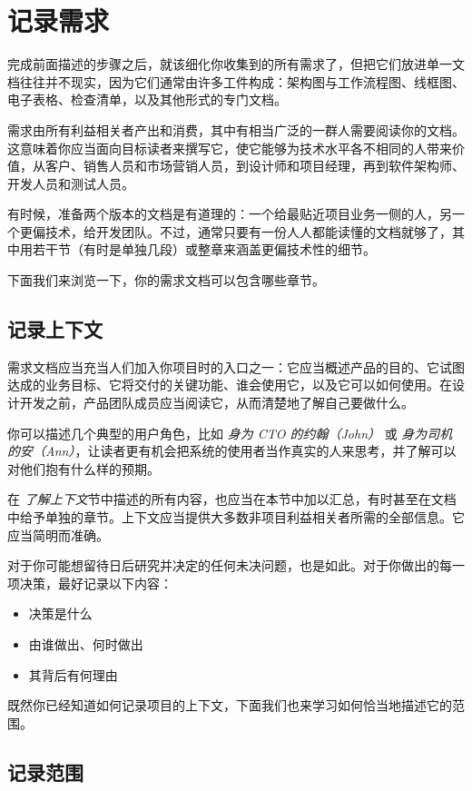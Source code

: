 \section{记录需求}

\label{idx:170}
完成前面描述的步骤之后，就该细化你收集到的所有需求了，但把它们放进单一文档往往并不现实，因为它们通常由许多工件构成：架构图与工作流程图、线框图、电子表格、检查清单，以及其他形式的专门文档。

需求由所有利益相关者产出和消费，其中有相当广泛的一群人需要阅读你的文档。这意味着你应当面向目标读者来撰写它，使它能够为技术水平各不相同的人带来价值，从客户、销售人员和市场营销人员，到设计师和项目经理，再到软件架构师、开发人员和测试人员。

有时候，准备两个版本的文档是有道理的：一个给最贴近项目业务一侧的人，另一个更偏技术，给开发团队。不过，通常只要有一份人人都能读懂的文档就够了，其中用若干节（有时是单独几段）或整章来涵盖更偏技术性的细节。

下面我们来浏览一下，你的需求文档可以包含哪些章节。

\subsection{记录上下文}

\label{idx:171}
需求文档应当充当人们加入你项目时的入口之一：它应当概述产品的目的、它试图达成的业务目标、它将交付的关键功能、谁会使用它，以及它可以如何使用。在设计开发之前，产品团队成员应当阅读它，从而清楚地了解自己要做什么。

你可以描述几个典型的用户角色，比如 \emph{身为 CTO 的约翰（John）} 或 \emph{身为司机的安（Ann）}，让读者更有机会把系统的使用者当作真实的人来思考，并了解可以对他们抱有什么样的预期。

在 \emph{了解上下文}节中描述的所有内容，也应当在本节中加以汇总，有时甚至在文档中给予单独的章节。上下文应当提供大多数非项目利益相关者所需的全部信息。它应当简明而准确。

对于你可能想留待日后研究并决定的任何未决问题，也是如此。对于你做出的每一项决策，最好记录以下内容：

\begin{itemize}
\item 决策是什么
\item 由谁做出、何时做出
\item 其背后有何理由
\end{itemize}

既然你已经知道如何记录项目的上下文，下面我们也来学习如何恰当地描述它的范围。

\subsection{记录范围}

